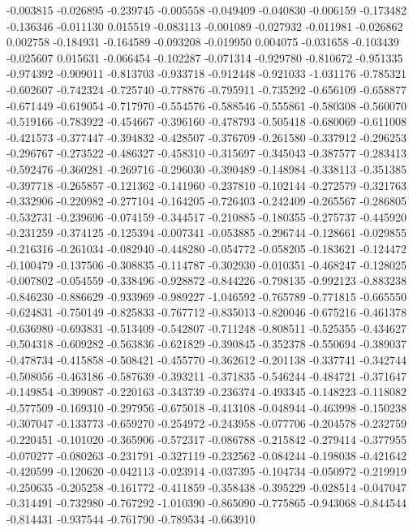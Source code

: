 -0.003815
-0.026895
-0.239745
-0.005558
-0.049409
-0.040830
-0.006159
-0.173482
-0.136346
-0.011130
0.015519
-0.083113
-0.001089
-0.027932
-0.011981
-0.026862
0.002758
-0.184931
-0.164589
-0.093208
-0.019950
0.004075
-0.031658
-0.103439
-0.025607
0.015631
-0.066454
-0.102287
-0.071314
-0.929780
-0.810672
-0.951335
-0.974392
-0.909011
-0.813703
-0.933718
-0.912448
-0.921033
-1.031176
-0.785321
-0.602607
-0.742324
-0.725740
-0.778876
-0.795911
-0.735292
-0.656109
-0.658877
-0.671449
-0.619054
-0.717970
-0.554576
-0.588546
-0.555861
-0.580308
-0.560070
-0.519166
-0.783922
-0.454667
-0.396160
-0.478793
-0.505418
-0.680069
-0.611008
-0.421573
-0.377447
-0.394832
-0.428507
-0.376709
-0.261580
-0.337912
-0.296253
-0.296767
-0.273522
-0.486327
-0.458310
-0.315697
-0.345043
-0.387577
-0.283413
-0.592476
-0.360281
-0.269716
-0.296030
-0.390489
-0.148984
-0.338113
-0.351385
-0.397718
-0.265857
-0.121362
-0.141960
-0.237810
-0.102144
-0.272579
-0.321763
-0.332906
-0.220982
-0.277104
-0.164205
-0.726403
-0.242409
-0.265567
-0.286805
-0.532731
-0.239696
-0.074159
-0.344517
-0.210885
-0.180355
-0.275737
-0.445920
-0.231259
-0.374125
-0.125394
-0.007341
-0.053885
-0.296744
-0.128661
-0.029855
-0.216316
-0.261034
-0.082940
-0.448280
-0.054772
-0.058205
-0.183621
-0.124472
-0.100479
-0.137506
-0.308835
-0.114787
-0.302930
-0.010351
-0.468247
-0.128025
-0.007802
-0.054559
-0.338496
-0.928872
-0.844226
-0.798135
-0.992123
-0.883238
-0.846230
-0.886629
-0.933969
-0.989227
-1.046592
-0.765789
-0.771815
-0.665550
-0.624831
-0.750149
-0.825833
-0.767712
-0.835013
-0.820046
-0.675216
-0.461378
-0.636980
-0.693831
-0.513409
-0.542807
-0.711248
-0.808511
-0.525355
-0.434627
-0.504318
-0.609282
-0.563836
-0.621829
-0.390845
-0.352378
-0.550694
-0.389037
-0.478734
-0.415858
-0.508421
-0.455770
-0.362612
-0.201138
-0.337741
-0.342744
-0.508056
-0.463186
-0.587639
-0.393211
-0.371835
-0.546244
-0.484721
-0.371647
-0.149854
-0.399087
-0.220163
-0.343739
-0.236374
-0.493345
-0.148223
-0.118082
-0.577509
-0.169310
-0.297956
-0.675018
-0.413108
-0.048944
-0.463998
-0.150238
-0.307047
-0.133773
-0.659270
-0.254972
-0.243958
-0.077706
-0.204578
-0.232759
-0.220451
-0.101020
-0.365906
-0.572317
-0.086788
-0.215842
-0.279414
-0.377955
-0.070277
-0.080263
-0.231791
-0.327119
-0.232562
-0.084244
-0.198038
-0.421642
-0.420599
-0.120620
-0.042113
-0.023914
-0.037395
-0.104734
-0.050972
-0.219919
-0.250635
-0.205258
-0.161772
-0.411859
-0.358438
-0.395229
-0.028514
-0.047047
-0.314491
-0.732980
-0.767292
-1.010390
-0.865090
-0.775865
-0.943068
-0.844544
-0.814431
-0.937544
-0.761790
-0.789534
-0.663910
